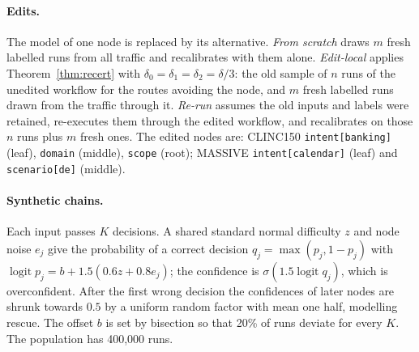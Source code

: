 \paragraph{Edits.} The model of one node is replaced by its alternative. \emph{From scratch}
draws $m$ fresh labelled runs from all traffic and recalibrates with them alone.
\emph{Edit-local} applies Theorem~\ref{thm:recert} with $\delta_0=\delta_1=\delta_2=\delta/3$:
the old sample of $n$ runs of the unedited workflow for the routes avoiding the node, and $m$
fresh labelled runs drawn from the traffic through it. \emph{Re-run} assumes the old inputs and
labels were retained, re-executes them through the edited workflow, and recalibrates on those
$n$ runs plus $m$ fresh ones. The edited nodes are: CLINC150 \texttt{intent[banking]} (leaf),
\texttt{domain} (middle), \texttt{scope} (root); MASSIVE \texttt{intent[calendar]} (leaf)
and \texttt{scenario[de]} (middle).

\paragraph{Synthetic chains.} Each input passes $K$ decisions. A shared standard normal
difficulty $z$ and node noise $e_j$ give the probability of a correct decision
$q_j=\max(p_j,1-p_j)$ with $\operatorname{logit}p_j=b+1.5(0.6z+0.8e_j)$; the confidence is
$\sigma(1.5\operatorname{logit}q_j)$, which is overconfident. After the first wrong decision
the confidences of later nodes are shrunk towards $0.5$ by a uniform random factor with mean
one half, modelling rescue. The offset $b$ is set by bisection so that 20\% of runs deviate
for every $K$. The population has 400{,}000 runs.

